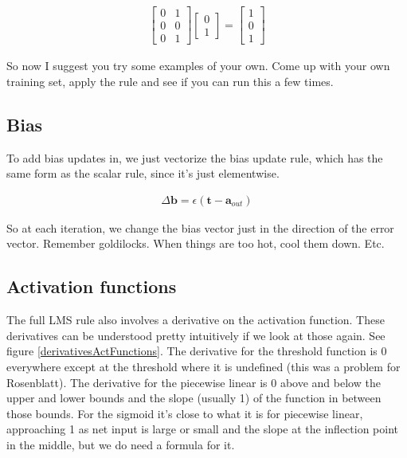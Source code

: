 \begin{align*}
\begin{bmatrix} 0 & 1 \\ 0 & 0 \\  0  & 1  \end{bmatrix}
\begin{bmatrix} 0 \\ 1 \end{bmatrix}
= \begin{bmatrix} 1 \\ 0 \\ 1  \end{bmatrix}
\end{align*}

So now I suggest you try some examples of your own. Come up with your own training set, apply the rule and see if you can run this a few times. 

\subsection{Bias}

To add bias updates in, we just vectorize the bias update rule, which has the same form as the scalar rule, since it's just elementwise.

\begin{eqnarray*}
\Delta \mathbf{b}  =  \epsilon (\mathbf{t} - \mathbf{a}_{out})
\end{eqnarray*}

So at each iteration, we change the bias vector just in the direction of the error vector. Remember goldilocks. When things are too hot, cool them down. Etc.

\subsection{Activation functions}

The full LMS rule also involves a derivative on the activation function. These derivatives can be understood pretty intuitively if we look at those again. See figure \ref{derivativesActFunctions}. The derivative for the threshold function is 0 everywhere except at the threshold where it is undefined (this was a problem for Rosenblatt). The derivative for the piecewise linear is 0 above and below the upper and lower bounds and the slope (usually 1) of the function in between those bounds. For the sigmoid it's close to what it is for piecewise linear, approaching 1 as net input is large or small and the slope at the inflection point in the middle, but we do need a formula for it.

